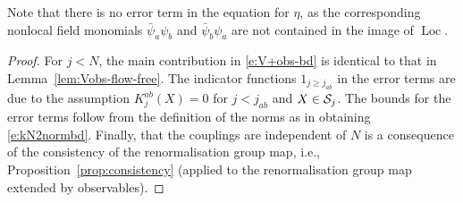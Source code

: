 \documentclass[11pt]{amsart}
\numberwithin{equation}{section}
\numberwithin{theorem}{section}
\newcommand{\1}{{\bf 1}}
\newcommand{\Loc}{\operatorname{Loc}}
\begin{document}
Note that there is no error term in the equation for $\eta$, as the
corresponding nonlocal field monomials $\bar\psi_{a}\psi_{b}$
and $\bar\psi_{b}\psi_{a}$ are not contained in the image of $\Loc$. 

\begin{proof}
  For $j<N$, the main contribution in \eqref{e:V+obs-bd} is identical
  to that in Lemma~\ref{lem:Vobs-flow-free}.  The indicator functions
  $1_{j\geq j_{ab}}$ in the error terms are due to the
  assumption $K_{j}^{ab}(X)=0$ for $j<j_{ab}$ and $X\in\mathcal S_{j}$.
  The bounds
  for the error terms follow from the definition of the norms
  as in obtaining \eqref{e:kN2normbd}.  Finally, that the couplings
  are independent of $N$ is a consequence of the consistency of the
  renormalisation group map, i.e., Proposition~\ref{prop:consistency}
  (applied to the renormalisation group map extended by observables).
\end{proof}
\end{document}
